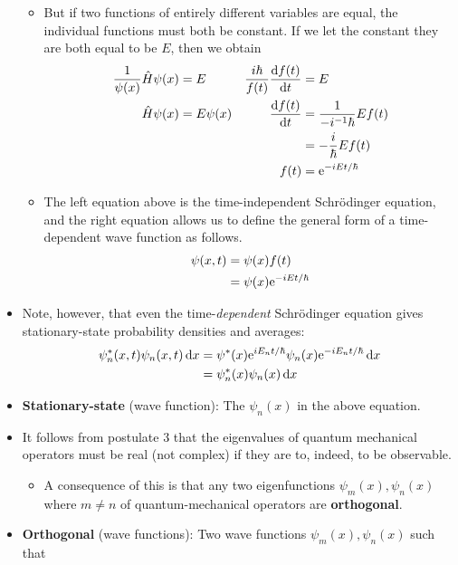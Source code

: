 \documentclass[../notes.tex]{subfiles}
\begin{document}
\begin{itemize}
\begin{itemize}
        \item But if two functions of entirely different variables are equal, the individual functions must both be constant. If we let the constant they are both equal to be $E$, then we obtain
        \begin{align*}
            \frac{1}{\psi(x)}\hat{H}\psi(x) &= E&
                \frac{i\hbar}{f(t)}\dv{f(t)}{t} &= E\\
            \hat{H}\psi(x) &= E\psi(x)&
                \dv{f(t)}{t} &= \frac{1}{-i^{-1}\hbar}Ef(t)\\
            &&
                &= -\frac{i}{\hbar}Ef(t)\\
            &&
                f(t) &= \e[-iEt/\hbar]
        \end{align*}
        \item The left equation above is the time-independent Schr\"{o}dinger equation, and the right equation allows us to define the general form of a time-dependent wave function as follows.
        \begin{align*}
            \psi(x,t) &= \psi(x)f(t)\\
            &= \psi(x)\e[-iEt/\hbar]
        \end{align*}
    \end{itemize}
    \item Note, however, that even the time-\emph{dependent} Schr\"{o}dinger equation gives stationary-state probability densities and averages:
    \begin{align*}
        \psi_n^*(x,t)\psi_n(x,t)\dd{x} &= \psi^*(x)\e[iE_nt/\hbar]\psi_n(x)\e[-iE_nt/\hbar]\dd{x}\\
        &= \psi_n^*(x)\psi_n(x)\dd{x}
    \end{align*}
    \item \textbf{Stationary-state} (wave function): The $\psi_n(x)$ in the above equation.
    \item It follows from postulate 3 that the eigenvalues of quantum mechanical operators must be real (not complex) if they are to, indeed, to be observable.
    \begin{itemize}
        \item A consequence of this is that any two eigenfunctions $\psi_m(x),\psi_n(x)$ where $m\neq n$ of quantum-mechanical operators are \textbf{orthogonal}.
    \end{itemize}
    \item \textbf{Orthogonal} (wave functions): Two wave functions $\psi_m(x),\psi_n(x)$ such that

\end{itemize}
\end{document}
